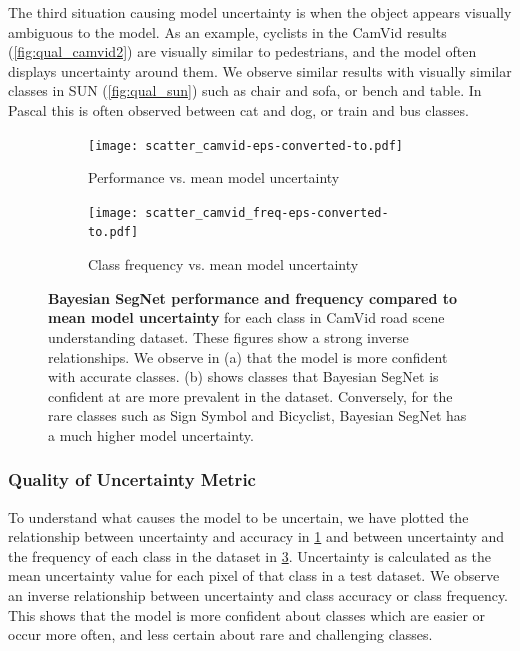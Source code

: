 The third situation causing model uncertainty is when the object appears visually ambiguous to the model. As an example, cyclists in the CamVid results (\cref{fig:qual_camvid2}) are visually similar to pedestrians, and the model often displays uncertainty around them. We observe similar results with visually similar classes in SUN (\cref{fig:qual_sun}) such as chair and sofa, or bench and table. In Pascal this is often observed between cat and dog, or train and bus classes.

\begin{figure}[t]
    \centering
    \begin{subfigure}[t]{0.45\linewidth}
        \centering
        \texttt{[image: scatter\_camvid-eps-converted-to.pdf]}
        \label{fig:unc_acc2}
        \caption{Performance vs. mean model uncertainty}
    \end{subfigure}
    \begin{subfigure}[t]{0.45\linewidth}
        \centering
        \texttt{[image: scatter\_camvid\_freq-eps-converted-to.pdf]}
        \label{fig:unc_freq2}
        \caption{Class frequency vs. mean model uncertainty}
    \end{subfigure}
	\caption[Analysis of Bayesian SegNet's model uncertainty.]{\textbf{Bayesian SegNet performance and frequency compared to mean model uncertainty} for each class in CamVid road scene understanding dataset. These figures show a strong inverse relationships. We observe in (a) that the model is more confident with accurate classes. (b) shows classes that Bayesian SegNet is confident at are more prevalent in the dataset. Conversely, for the rare classes such as Sign Symbol and Bicyclist, Bayesian SegNet has a much higher model uncertainty.}
\end{figure}

\subsubsection{Quality of Uncertainty Metric}

To understand what causes the model to be uncertain, we have plotted the relationship between uncertainty and accuracy in \cref{fig:unc_acc2} and between uncertainty and the frequency of each class in the dataset in \cref{fig:unc_freq2}. Uncertainty is calculated as the mean uncertainty value for each pixel of that class in a test dataset. We observe an inverse relationship between uncertainty and class accuracy or class frequency. This shows that the model is more confident about classes which are easier or occur more often, and less certain about rare and challenging classes.

